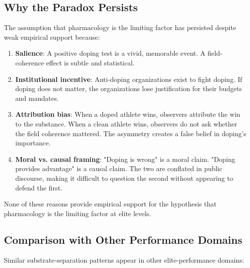 \documentclass[11pt,twocolumn]{article}
\theoremstyle{definition}
\theoremstyle{remark}
\begin{document}
\subsection{Why the Paradox Persists}

The assumption that pharmacology is the limiting factor has persisted despite weak empirical support because:

\begin{enumerate}[leftmargin=1.2em]
\item \textbf{Salience}: A positive doping test is a vivid, memorable event. A field-coherence effect is subtle and statistical.

\item \textbf{Institutional incentive}: Anti-doping organizations exist to fight doping. If doping does not matter, the organizations lose justification for their budgets and mandates.

\item \textbf{Attribution bias}: When a doped athlete wins, observers attribute the win to the substance. When a clean athlete wins, observers do not ask whether the field coherence mattered. The asymmetry creates a false belief in doping's importance.

\item \textbf{Moral vs. causal framing}: "Doping is wrong" is a moral claim. "Doping provides advantage" is a causal claim. The two are conflated in public discourse, making it difficult to question the second without appearing to defend the first.

\end{enumerate}

None of these reasons provide empirical support for the hypothesis that pharmacology is the limiting factor at elite levels.

\subsection{Comparison with Other Performance Domains}

Similar substrate-separation patterns appear in other elite-performance domains:
\end{document}
